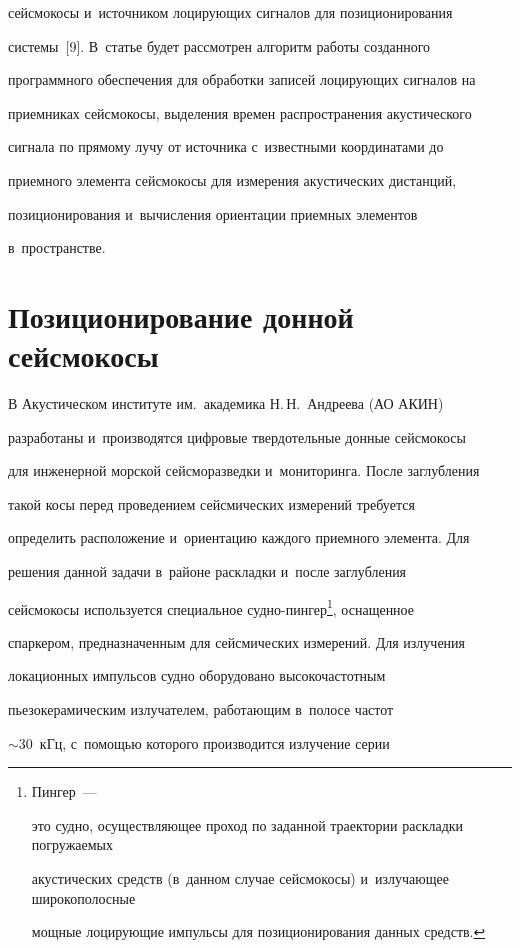 сейсмокосы и~источником лоцирующих сигналов для позиционирования 

системы~[9]. В~статье будет рассмотрен алгоритм работы созданного 

программного обеспечения для обработки записей ло\-ци\-ру\-ющих сигналов на 

приемниках сейсмокосы, выделения времен распространения акустического 

сигнала по прямому лучу от источника с~известными координатами до 

приемного элемента сейсмокосы для измерения акустических дистанций, 

позиционирования и~вычисления ориентации приемных элементов 

в~пространстве.



\section{Позиционирование донной сейсмокосы}



В Акустическом институте им.\ академика Н.\,Н.~Андреева (АО АКИН) 

разработаны и~производятся цифровые твердотельные донные сейсмокосы 

для инженерной морской сейсморазведки и~мониторинга. После заглубления 

такой косы перед проведением сейсмических измерений требуется 

определить расположение и~ориентацию каждого приемного элемента. Для 

решения данной задачи в~районе раскладки и~после заглубления 

сейсмокосы используется специальное суд\-но-пин\-гер\footnote{Пингер~--- 

это судно, осуществляющее проход по заданной траектории раскладки погружаемых 

акустических средств (в~данном случае сейсмокосы) и~излучающее широкополосные 

мощные лоцирующие импульсы для позиционирования данных средств.}, оснащенное 

спаркером, предназначенным для сейсмических измерений. Для излучения 

локационных импульсов судно оборудовано высокочастотным 

пьезокерамическим излучателем, работающим в~полосе частот 

$\sim30$~кГц, с~помощью которого производится излучение серии 

